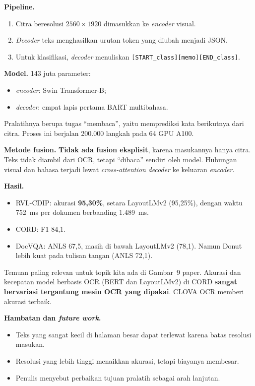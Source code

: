 \textbf{Pipeline.}
\begin{enumerate}
  \item Citra beresolusi $2560\times1920$ dimasukkan ke \textit{encoder} visual.
  \item \textit{Decoder} teks menghasilkan urutan token yang diubah menjadi JSON.
  \item Untuk klasifikasi, \textit{decoder} menuliskan \texttt{[START\_class][memo][END\_class]}.
\end{enumerate}

\textbf{Model.} 143 juta parameter:
\begin{itemize}
  \item \textit{encoder}: Swin Transformer-B;
  \item \textit{decoder}: empat lapis pertama BART multibahasa.
\end{itemize}
Pralatihnya berupa tugas \enquote{membaca}, yaitu memprediksi kata berikutnya dari citra.
Proses ini berjalan 200.000 langkah pada 64 GPU A100.

\textbf{Metode fusion.} \textbf{Tidak ada fusion eksplisit}, karena masukannya hanya citra.
Teks tidak diambil dari OCR, tetapi \enquote{dibaca} sendiri oleh model. Hubungan visual
dan bahasa terjadi lewat \textit{cross-attention} \textit{decoder} ke keluaran
\textit{encoder}.

\textbf{Hasil.}
\begin{itemize}
  \item RVL-CDIP: akurasi \textbf{95,30\%}, setara LayoutLMv2 (95,25\%), dengan waktu
  752~ms per dokumen berbanding 1.489~ms.
  \item CORD: F1 84,1.
  \item DocVQA: ANLS 67,5, masih di bawah LayoutLMv2 (78,1). Namun Donut lebih kuat pada
  tulisan tangan (ANLS 72,1).
\end{itemize}

Temuan paling relevan untuk topik kita ada di Gambar~9 paper. Akurasi dan kecepatan model
berbasis OCR (BERT dan LayoutLMv2) di CORD \textbf{sangat bervariasi tergantung mesin OCR
yang dipakai}. CLOVA OCR memberi akurasi terbaik.

\textbf{Hambatan dan \textit{future work}.}
\begin{itemize}
  \item Teks yang sangat kecil di halaman besar dapat terlewat karena batas resolusi
  masukan.
  \item Resolusi yang lebih tinggi menaikkan akurasi, tetapi biayanya membesar.
  \item Penulis menyebut perbaikan tujuan pralatih sebagai arah lanjutan.
\end{itemize}

